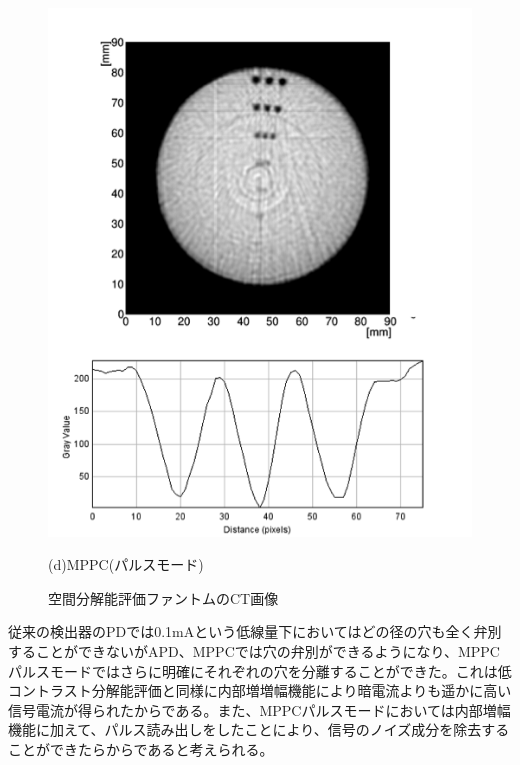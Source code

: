 \begin{figure}[H]
\begin{minipage}{0.5\hsize}
\begin{center}
    \includegraphics[bb=0.000000 0.000000 235.180558 293.255758,width=1.11\hsize]{image2/chapter5/spatial_MPPC_pulse.png}
  \end{center}
    \vspace{-0.5cm}\hspace{2.0cm}
   (d)MPPC(パルスモード)
 \end{minipage}
 \begin{center}
  \vspace{-1zh}
  \caption{空間分解能評価ファントムのCT画像}
  \label{fig:fire}
  \end{center}
\end{figure}

従来の検出器のPDでは0.1mAという低線量下においてはどの径の穴も全く弁別することができないがAPD、MPPCでは穴の弁別ができるようになり、MPPCパルスモードではさらに明確にそれぞれの穴を分離することができた。これは低コントラスト分解能評価と同様に内部増増幅機能により暗電流よりも遥かに高い信号電流が得られたからである。また、MPPCパルスモードにおいては内部増幅機能に加えて、パルス読み出しをしたことにより、信号のノイズ成分を除去することができたらからであると考えられる。



